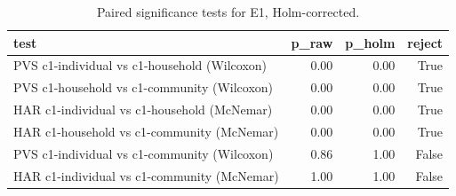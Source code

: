 \begin{table}[t]
\centering
\small
\caption{Paired significance tests for E1, Holm-corrected.}
\label{tab:e1-tests}
\begin{tabular}{lrrr}
\toprule
test & p\_raw & p\_holm & reject \\
\midrule
PVS c1-individual vs c1-household (Wilcoxon) & 0.00 & 0.00 & True \\
PVS c1-household vs c1-community (Wilcoxon) & 0.00 & 0.00 & True \\
HAR c1-individual vs c1-household (McNemar) & 0.00 & 0.00 & True \\
HAR c1-household vs c1-community (McNemar) & 0.00 & 0.00 & True \\
PVS c1-individual vs c1-community (Wilcoxon) & 0.86 & 1.00 & False \\
HAR c1-individual vs c1-community (McNemar) & 1.00 & 1.00 & False \\
\bottomrule
\end{tabular}
\end{table}
